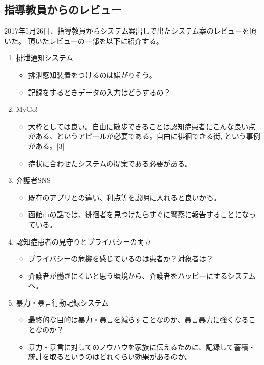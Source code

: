 \documentclass[../report]{subfiles}
\begin{document}
\subsection{指導教員からのレビュー}
2017年5月26日、指導教員からシステム案出しで出たシステム案のレビューを頂いた。
頂いたレビューの一部を以下に紹介する。
\begin{enumerate}
    \item 排泄通知システム
        \begin{itemize}
            \item 排泄感知装置をつけるのは嫌がりそう。
            \item 記録をするときデータの入力はどうするの？
        \end{itemize}
    \item MyGo!
        \begin{itemize}
            \item 大枠としては良い。自由に散歩できることは認知症患者にこんな良い点がある、というアピールが必要である。自由に徘徊できる街, という事例がある。[3]
            \item 症状に合わせたシステムの提案である必要がある。
        \end{itemize}
    \item 介護者SNS
        \begin{itemize}
            \item 既存のアプリとの違い、利点等を説明に入れると良いかも。
            \item 函館市の話では、徘徊者を見つけたらすぐに警察に報告することになっている。
        \end{itemize}
    \item 認知症患者の見守りとプライバシーの両立
        \begin{itemize}
            \item プライバシーの危機を感じているのは患者か？対象者は？
            \item 介護者が働きにくいと思う環境から、介護者をハッピーにするシステムへ。
        \end{itemize}
    \item 暴力・暴言行動記録システム
        \begin{itemize}
            \item 最終的な目的は暴力・暴言を減らすことなのか、暴言暴力に強くなることなのか？
            \item 暴力・暴言に対してのノウハウを家族に伝えるために、記録して蓄積・統計を取るというのはどれくらい効果があるのか。
        \end{itemize}
\end{enumerate}
\end{document}

